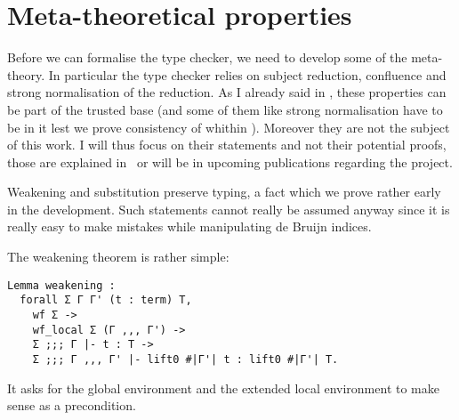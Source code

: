 \chapter{Meta-theoretical properties}

Before we can formalise the type checker, we need to develop some of the
meta-theory. In particular the type checker relies on subject reduction,
confluence and strong normalisation of the reduction.
As I already said in , these properties can be part of
the trusted base (and some of them like strong normalisation have to be in it
lest we prove consistency of \Coq whithin \Coq). Moreover they are not the
subject of this work. I will thus focus on their statements and not their
potential proofs, those are explained in~ or will be
in upcoming publications regarding the \MetaCoq project.


Weakening and substitution preserve typing, a fact which we prove rather early
in the development. Such statements cannot really be assumed anyway since it is
really easy to make mistakes while manipulating de Bruijn indices.

The weakening theorem is rather simple:
\begin{verbatim}
Lemma weakening :
  forall Σ Γ Γ' (t : term) T,
    wf Σ ->
    wf_local Σ (Γ ,,, Γ') ->
    Σ ;;; Γ |- t : T ->
    Σ ;;; Γ ,,, Γ' |- lift0 #|Γ'| t : lift0 #|Γ'| T.
\end{verbatim}
It asks for the global environment and the extended local environment to make
sense as a precondition.

